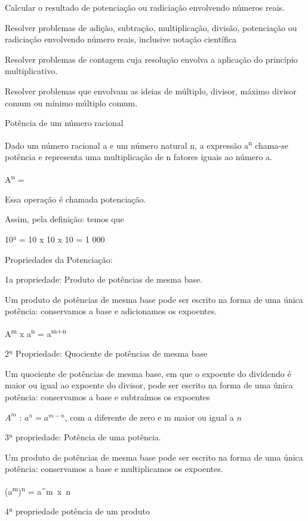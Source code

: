 Calcular o resultado de potenciação ou radiciação envolvendo números
reais.

Resolver problemas de adição, subtração, multiplicação, divisão,
potenciação ou radiciação envolvendo número reais, inclusive notação
científica

Resolver problemas de contagem cuja resolução envolva a aplicação do
princípio multiplicativo.

Resolver problemas que envolvam as ideias de múltiplo, divisor, máximo
divisor comum ou mínimo múltiplo comum.

Potência de um número racional

Dado um número racional a e um número natural n, a expressão
a\textsuperscript{n} chama-se potência e representa uma multiplicação de
n fatores iguais ao número a.

A\textsuperscript{n} =


Essa operação é chamada potenciação.

Assim, pela definição: temos que

10³ = 10 x 10 x 10 = 1 000

Propriedades da Potenciação:

1a propriedade: Produto de potências de mesma base.

Um produto de potências de mesma base pode ser escrito na forma de uma
única potência: conservamos a base e adicionamos os expoentes.

A\textsuperscript{m} x a\textsuperscript{n} = a\textsuperscript{m+n}

2ª Propriedade: Quociente de potências de mesma base

Um quociente de potências de mesma base, em que o expoente do dividendo
é maior ou igual ao expoente do divisor, pode ser escrito na forma de
uma única potência: conservamos a base e subtraímos os expoentes

$A^{m}$ : $a^{n} = a^{m-n}$,
com a diferente de zero e m maior ou igual a $n$

3ª propriedade: Potência de uma potência.

Um produto de potências de mesma base pode ser escrito na forma de uma
única potência: conservamos a base e multiplicamos os expoentes.

(a\textsuperscript{m})\textsuperscript{n} = a^{m~x~n}

4ª propriedade potência de um produto

